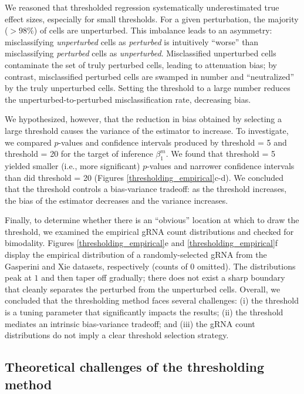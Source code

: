 \documentclass[11pt]{article}
\begin{document}
We reasoned that thresholded regression systematically underestimated true effect sizes, especially for small thresholds. For a given perturbation, the majority ($>98\%$) of cells are unperturbed. This imbalance leads to an asymmetry: misclassifying \textit{unperturbed} cells as \textit{perturbed} is intuitively ``worse'' than misclassifying \textit{perturbed} cells as \textit{unperturbed}. Misclassified unperturbed cells contaminate the set of truly perturbed cells, leading to attenuation bias; by contrast, misclassified perturbed cells are swamped in number and ``neutralized'' by the truly unperturbed cells. Setting the threshold to a large number reduces the unperturbed-to-perturbed misclassification rate, decreasing bias.

We hypothesized, however, that the reduction in bias obtained by selecting a large threshold causes the variance of the estimator to increase. To investigate, we compared $p$-values and confidence intervals produced by threshold = 5 and threshold = 20 for the target of inference $\beta^m_1$. We found that threshold = 5 yielded smaller (i.e., more significant) $p$-values and narrower confidence intervals than did threshold = 20 (Figures \ref{thresholding_empirical}c-d). We concluded that the threshold controls a bias-variance tradeoff: as the threshold increases, the bias of the estimator decreases and the variance increases.

Finally, to determine whether there is an ``obvious'' location at which to draw the threshold, we examined the empirical gRNA count distributions and checked for bimodality. Figures \ref{thresholding_empirical}e and \ref{thresholding_empirical}f display the empirical distribution of a randomly-selected gRNA from the Gasperini and Xie datasets, respectively (counts of $0$ omitted). The distributions peak at $1$ and then taper off gradually; there does not exist a sharp boundary that cleanly separates the perturbed from the unperturbed cells. Overall, we concluded that the thresholding method faces several challenges: (i) the threshold is a tuning parameter that significantly impacts the results; (ii) the threshold mediates an intrinsic bias-variance tradeoff; and (iii) the gRNA count distributions do not imply a clear threshold selection strategy.

\subsection{Theoretical challenges of the thresholding method}\label{sec:thresholding_theory}
\end{document}
